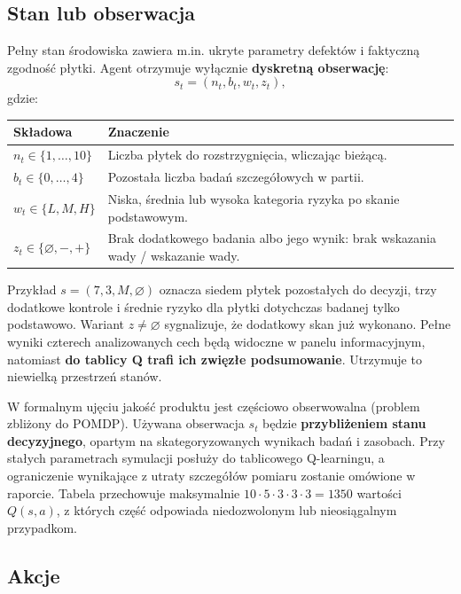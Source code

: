 \documentclass[12pt]{article}
\begin{document}
\subsection{Stan lub obserwacja}

Pełny stan środowiska zawiera m.in. ukryte parametry defektów i faktyczną zgodność płytki. Agent otrzymuje wyłącznie \textbf{dyskretną obserwację}:
\begin{equation}
    s_t=(n_t,b_t,w_t,z_t),
\end{equation}
\noindent gdzie:
\begin{center}
\renewcommand{\arraystretch}{1.2}
\begin{tabular}{p{}p{}}
\toprule
Składowa & Znaczenie \\
\midrule
\(n_t\in\{1,\ldots,10\}\) & Liczba płytek do rozstrzygnięcia, wliczając bieżącą. \\
\(b_t\in\{0,\ldots,4\}\) & Pozostała liczba badań szczegółowych w partii. \\
\(w_t\in\{L,M,H\}\) & Niska, średnia lub wysoka kategoria ryzyka po skanie podstawowym. \\
\(z_t\in\{\varnothing,-,+\}\) & Brak dodatkowego badania albo jego wynik: brak wskazania wady / wskazanie wady. \\
\bottomrule
\end{tabular}
\end{center}

Przykład \(s=(7,3,M,\varnothing)\) oznacza siedem płytek pozostałych do decyzji, trzy dodatkowe kontrole i średnie ryzyko dla płytki dotychczas badanej tylko podstawowo. Wariant \(z\neq\varnothing\) sygnalizuje, że dodatkowy skan już wykonano. Pełne wyniki czterech analizowanych cech będą widoczne w panelu informacyjnym, natomiast \textbf{do tablicy Q trafi ich zwięzłe podsumowanie}. Utrzymuje to niewielką przestrzeń stanów.

W formalnym ujęciu jakość produktu jest częściowo obserwowalna (problem zbliżony do POMDP). Używana obserwacja \(s_t\) będzie \textbf{przybliżeniem stanu decyzyjnego}, opartym na skategoryzowanych wynikach badań i zasobach. Przy stałych parametrach symulacji posłuży do tablicowego Q-learningu, a ograniczenie wynikające z utraty szczegółów pomiaru zostanie omówione w raporcie. Tabela przechowuje maksymalnie \(10\cdot5\cdot3\cdot3\cdot3=1350\) wartości \(Q(s,a)\), z których część odpowiada niedozwolonym lub nieosiągalnym przypadkom.

\subsection{Akcje}
\end{document}
